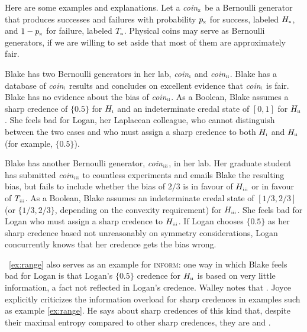 \documentclass[phd,12pt,oneside]{ubcthesis}
\begin{document}
Here are some examples and explanations. Let a
\textit{coin}$_{\mbox{\tiny{x}}}$ be a Bernoulli generator that
produces successes and failures with probability $p_{\mbox{\tiny{x}}}$
for success, labeled $H_{\mbox{\tiny{x}}}$, and
$1-p_{\mbox{\tiny{x}}}$ for failure, labeled $T_{\mbox{\tiny{x}}}$.
Physical coins may serve as Bernoulli generators, if we are willing to
set aside that most of them are approximately fair.

\begin{quotex}
  \label{ex:range} Blake has two Bernoulli generators
  in her lab, \textit{coin}$_{\mbox{\tiny{i}}}$ and
  \textit{coin}$_{\mbox{\tiny{ii}}}$. Blake has a database of
  \textit{coin}$_{\mbox{\tiny{i}}}$ results and concludes on excellent
  evidence that \textit{coin}$_{\mbox{\tiny{i}}}$ is fair. Blake has
  no evidence about the bias of \textit{coin}$_{\mbox{\tiny{ii}}}$. As
  a Boolean, Blake assumes a sharp credence of $\{0.5\}$ for
  $H_{\mbox{\tiny{i}}}$ and an indeterminate credal state of $[0,1]$
  for $H_{\mbox{\tiny{ii}}}$. She feels bad for Logan, her Laplacean
  colleague, who cannot distinguish between the two cases and who must
  assign a sharp credence to both $H_{\mbox{\tiny{i}}}$ and
  $H_{\mbox{\tiny{ii}}}$ (for example, $\{0.5\}$).
\end{quotex}

\begin{quotex}
  \label{ex:incomp} Blake has another Bernoulli
  generator, \textit{coin}$_{\mbox{\tiny{iii}}}$, in her lab. Her
  graduate student has submitted \textit{coin}$_{\mbox{\tiny{iii}}}$
  to countless experiments and emails Blake the resulting bias, but
  fails to include whether the bias of $2/3$ is in favour of
  $H_{\mbox{\tiny{iii}}}$ or in favour of $T_{\mbox{\tiny{iii}}}$. As
  a Boolean, Blake assumes an indeterminate credal state of
  $[1/3,2/3]$ (or $\{1/3,2/3\}$, depending on the convexity
  requirement) for $H_{\mbox{\tiny{iii}}}$. She feels bad for Logan
  who must assign a sharp credence to $H_{\mbox{\tiny{iii}}}$. If
  Logan chooses $\{0.5\}$ as her sharp credence based not unreasonably
  on symmetry considerations, Logan concurrently knows that her
  credence gets the bias wrong.
\end{quotex}

{\Xample}~\ref{ex:range} also serves as an example for \textsc{inform}:
one way in which Blake feels bad for Logan is that Logan's $\{0.5\}$
credence for $H_{\mbox{\tiny{ii}}}$ is based on very little
information, a fact not reflected in Logan's credence. Walley notes
that 
. Joyce explicitly criticizes the information
overload for sharp credences in examples such as example
\ref{ex:range}. He says about sharp credences of this kind that,
despite their maximal entropy compared to other sharp credences, they
are  and  .
\end{document}
